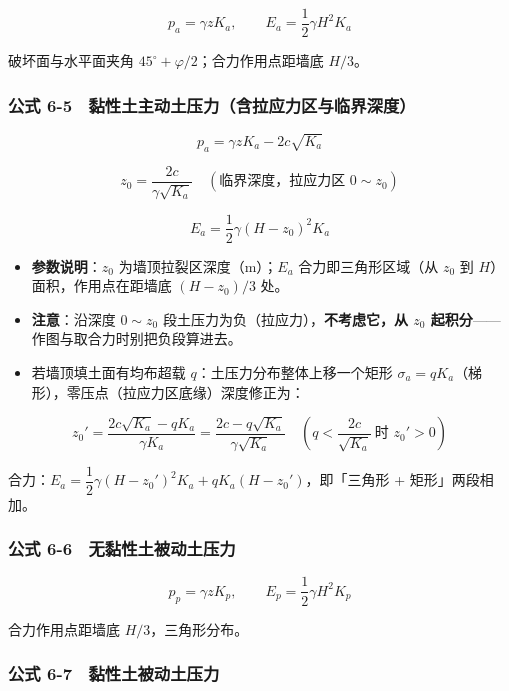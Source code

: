 \documentclass[
]{article}
\providecommand{\tightlist}{%
  \setlength{\itemsep}{0pt}\setlength{\parskip}{0pt}}
\begin{document}
\[p_a=\gamma zK_a,\qquad E_a=\frac{1}{2}\gamma H^2K_a\]

破坏面与水平面夹角 \(45^{\circ}+\varphi/2\)；合力作用点距墙底 \(H/3\)。

\subsubsection{公式
6-5　黏性土主动土压力（含拉应力区与临界深度）}\label{ux516cux5f0f-6-5-ux9ecfux6027ux571fux4e3bux52a8ux571fux538bux529bux542bux62c9ux5e94ux529bux533aux4e0eux4e34ux754cux6df1ux5ea6}

\[p_a=\gamma zK_a-2c\sqrt{K_a}\]

\[z_0=\frac{2c}{\gamma\sqrt{K_a}}\quad(\text{临界深度，拉应力区 }0\sim z_0)\]

\[E_a=\frac{1}{2}\gamma(H-z_0)^2K_a\]

\begin{itemize}
\tightlist
\item
  \textbf{参数说明}：\(z_0\) 为墙顶拉裂区深度（m）；\(E_a\)
  合力即三角形区域（从 \(z_0\) 到 \(H\)）面积，作用点在距墙底
  \((H-z_0)/3\) 处。
\item
  \textbf{注意}：沿深度 \(0\sim z_0\)
  段土压力为负（拉应力），\textbf{不考虑它，从 \(z_0\)
  起积分}------作图与取合力时别把负段算进去。
\item
  若墙顶填土面有均布超载 \(q\)：土压力分布整体上移一个矩形
  \(\sigma_a=qK_a\)（梯形），零压点（拉应力区底缘）深度修正为：
\end{itemize}

\[z_0'=\frac{2c\sqrt{K_a}-qK_a}{\gamma K_a}=\frac{2c-q\sqrt{K_a}}{\gamma\sqrt{K_a}}\quad(q<\frac{2c}{\sqrt{K_a}}\ \text{时 }z_0'>0)\]

合力：\(E_a=\dfrac{1}{2}\gamma(H-z_0')^2K_a+qK_a(H-z_0')\)，即「三角形 +
矩形」两段相加。

\subsubsection{公式
6-6　无黏性土被动土压力}\label{ux516cux5f0f-6-6-ux65e0ux9ecfux6027ux571fux88abux52a8ux571fux538bux529b}

\[p_p=\gamma zK_p,\qquad E_p=\frac{1}{2}\gamma H^2K_p\]

合力作用点距墙底 \(H/3\)，三角形分布。

\subsubsection{公式
6-7　黏性土被动土压力}\label{ux516cux5f0f-6-7-ux9ecfux6027ux571fux88abux52a8ux571fux538bux529b}
\end{document}
